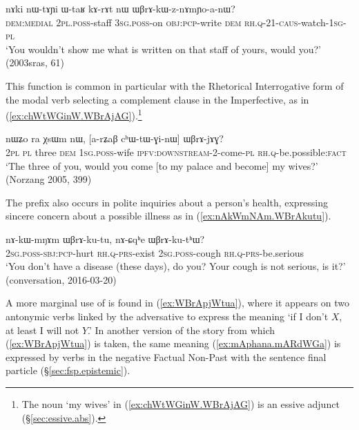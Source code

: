 \begin{exe}
\ex \label{ex:WBrAkWznAmYoanW}
 \gll nɤki nɯ-tɤɲi ɯ-taʁ kɤ-rɤt nɯ ɯβrɤ-kɯ-z-nɤmɲo-a-nɯ? \\
 \textsc{dem}:\textsc{medial} \textsc{2pl}.\textsc{poss}-staff \textsc{3sg}.\textsc{poss}-on \textsc{obj}:\textsc{pcp}-write \textsc{dem} \textsc{rh}.\textsc{q}-2\fl{}1-\textsc{caus}-watch-\textsc{1sg}-\textsc{pl} \\
 \glt `You wouldn't show me what is written on that staff of yours, would you?' (2003sras, 61)
\end{exe}

 This function is common in particular with the Rhetorical Interrogative form  of the modal verb  selecting a complement clause in the Imperfective, as in (\ref{ex:chWtWGinW.WBrAjAG}).\footnote{The noun  `my wives' in (\ref{ex:chWtWGinW.WBrAjAG}) is an essive adjunct (§\ref{sec:essive.abs}).  }
 

\begin{exe}
\ex \label{ex:chWtWGinW.WBrAjAG}
 \gll nɯʑo ra χsɯm nɯ, [a-rʑaβ cʰɯ-tɯ-ɣi-nɯ] ɯβrɤ-jɤɣ? \\
 \textsc{2pl} \textsc{pl} three \textsc{dem} \textsc{1sg}.\textsc{poss}-wife \textsc{ipfv}:\textsc{downstream}-2-come-\textsc{pl} \textsc{rh}.\textsc{q}-be.possible:\textsc{fact} \\
 \glt `The three of you, would you come [to my palace and become] my wives?' (Norzang 2005, 399)
\end{exe}

The prefix  also occurs in polite inquiries about a person's health, expressing sincere concern about a possible illness as in (\ref{ex:nAkWmNAm.WBrAkutu}).

\begin{exe}
\ex \label{ex:nAkWmNAm.WBrAkutu}
 \gll  nɤ-kɯ-mŋɤm ɯβrɤ-ku-tu, nɤ-ɕqʰe ɯβrɤ-ku-tʰɯ? \\
\textsc{2sg}.\textsc{poss}-\textsc{sbj}:\textsc{pcp}-hurt  \textsc{rh}.\textsc{q}-\textsc{prs}-exist 
\textsc{2sg}.\textsc{poss}-cough  \textsc{rh}.\textsc{q}-\textsc{prs}-be.serious \\
\glt `You don't have a disease (these days), do you? Your cough is not serious, is it?' (conversation, 2016-03-20)
\end{exe}

A more marginal use of  is found in (\ref{ex:WBrApjWtua}), where it appears  on two antonymic verbs linked by the adversative  to express the meaning `if I don't $X$, at least I will not $Y$.' In another version of the story from which (\ref{ex:WBrApjWtua}) is taken, the same meaning (\ref{ex:mAphana.mARdWGa}) is expressed by verbs in the negative Factual Non-Past with the sentence final particle  (§\ref{sec:fsp.epistemic}).

